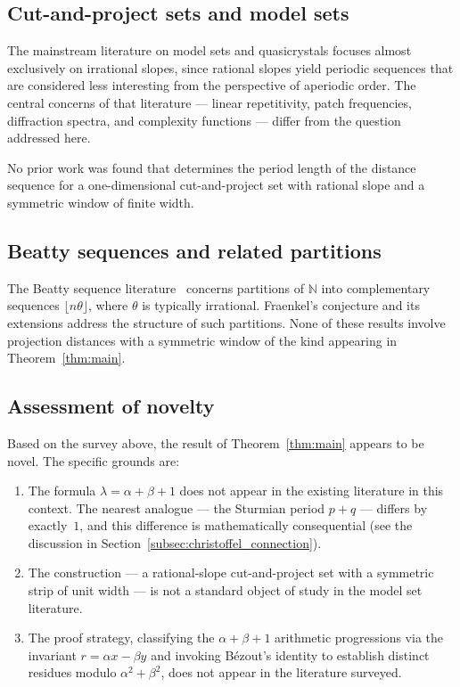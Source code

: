 \documentclass[11pt]{article}
\theoremstyle{plain}
\theoremstyle{definition}
\theoremstyle{remark}
\begin{document}
\subsection{Cut-and-project sets and model sets}

The mainstream literature on model sets and quasicrystals
\cite{Senechal2009, Meyer1972, HaynesEtAl2016} focuses almost exclusively on
irrational slopes, since rational slopes yield periodic sequences that are
considered less interesting from the perspective of aperiodic order.
The central concerns of that literature --- linear repetitivity, patch
frequencies, diffraction spectra, and complexity functions --- differ from the
question addressed here.

No prior work was found that determines the period length of the distance
sequence for a one-dimensional cut-and-project set with rational slope and a
symmetric window of finite width.

\subsection{Beatty sequences and related partitions}

The Beatty sequence literature~\cite{Fraenkel1969} concerns partitions of
$\mathbb{N}$ into complementary sequences $\lfloor n\theta \rfloor$, where
$\theta$ is typically irrational.  Fraenkel's conjecture and its extensions
address the structure of such partitions.  None of these results involve
projection distances with a symmetric window of the kind appearing in
Theorem~\ref{thm:main}.

\subsection{Assessment of novelty}

Based on the survey above, the result of Theorem~\ref{thm:main} appears to be
novel.  The specific grounds are:
\begin{enumerate}
    \item The formula $\lambda = \alpha + \beta + 1$ does not appear in the
          existing literature in this context.  The nearest analogue --- the
          Sturmian period $p + q$ --- differs by exactly~$1$, and this
          difference is mathematically consequential (see the discussion in
          Section~\ref{subsec:christoffel_connection}).

    \item The construction --- a rational-slope cut-and-project set with a
          symmetric strip of unit width --- is not a standard object of study
          in the model set literature.

    \item The proof strategy, classifying the $\alpha+\beta+1$ arithmetic
          progressions via the invariant $r = \alpha x - \beta y$ and invoking
          B\'{e}zout's identity to establish distinct residues modulo
          $\alpha^2+\beta^2$, does not appear in the literature surveyed.
\end{enumerate}
\end{document}
